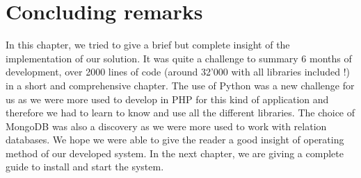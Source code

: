 \section{Concluding remarks}
In this chapter, we tried to give a brief but complete insight of the implementation of our solution. It was quite a challenge to summary 6 months of development, over 2000 lines of code (around 32'000 with all libraries included !) in a short and comprehensive chapter. The use of Python was a new challenge for us as we were more used to develop in PHP for this kind of application and therefore we had to learn to know and use all the different libraries. The choice of MongoDB was also a discovery as we were more used to work with relation databases. We hope we were able to give the reader a good insight of operating method of our developed system. In the next chapter, we are giving a complete guide to install and start the system.
